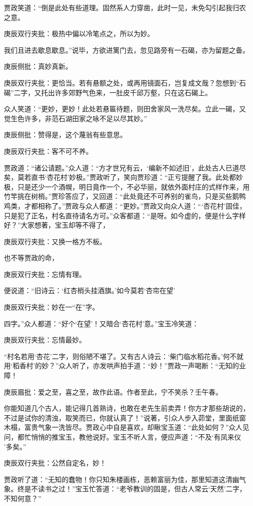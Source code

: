 \begin{parag}


    贾政笑道：“倒是此处有些道理。固然系人力穿凿，此时一见，未免勾引起我归农之意。\begin{note}庚辰双行夹批：极热中偏以冷笔点之，所以为妙。\end{note}我们且进去歇息歇息。”说毕，方欲进篱门去，忽见路旁有一石碣，亦为留题之备。\begin{note}庚辰侧批：真妙真新。\end{note}\begin{note}庚辰双行夹批：更恰当。若有悬额之处，或再用镜面石，岂复成文哉？忽想到“石碣”二字，又托出许多郊野气色来，一肚皮千邱万壑，只在这石碣上。\end{note}众人笑道：“更妙，更妙！此处若悬匾待题，则田舍家风一洗尽矣。立此一碣，又觉生色许多，非范石湖田家之咏不足以尽其妙。”\begin{note}庚辰侧批：赞得是，这个蔑翁有些意思。\end{note}\begin{note}庚辰双行夹批：客不可不养。\end{note}贾政道：“诸公请题。”众人道：“方才世兄有云，‘编新不如述旧’，此处古人已道尽矣，莫若直书‘杏花村’妙极。”贾政听了，笑向贾珍道：“正亏提醒了我。此处都妙极，只是还少一个酒幌，明日竟作一个，不必华丽，就依外面村庄的式样作来，用竹竿挑在树梢。”贾珍答应了，又回道：“此处竟还不可养别的雀鸟，只是买些鹅鸭鸡类，才都相称了。”贾政与众人都道：“更妙。”贾政又向众人道：“‘杏花村’固佳，只是犯了正名，村名直待请名方可。”众客都道：“是呀。如今虚的，便是什么字样好？”大家想著，宝玉却等不得了，\begin{note}庚辰双行夹批：又换一格方不板。\end{note}也不等贾政的命，\begin{note}庚辰双行夹批：忘情有理。\end{note}便说道：“旧诗云：‘红杏梢头挂酒旗。’如今莫若‘杏帘在望’\begin{note}庚辰双行夹批：妙在一“在”字。\end{note}四字。”众人都道：“好个‘在望’！又暗合‘杏花村’意。”宝玉冷笑道：\begin{note}庚辰双行夹批：忘情最妙。\end{note}“村名若用‘杏花’二字，则俗陋不堪了。又有古人诗云：‘柴门临水稻花香。’何不就用‘稻香村’的妙？”众人听了，亦发哄声拍手道：“妙！”贾政一声喝断：“无知的业障！\begin{note}庚辰眉批：爱之至，喜之至，故作此语。作者至此，宁不笑杀？壬午春。\end{note}你能知道几个古人，能记得几首熟诗，也敢在老先生前卖弄！你方才那些胡说的，不过是试你的清浊，取笑而已，你就认真了！”说著，引众人步入茆堂，里面纸窗木榻，富贵气象一洗皆尽。贾政心中自是喜欢，却瞅宝玉道：“此处如何？”众人见问，都忙悄悄的推宝玉，教他说好。宝玉不听人言，便应声道：“不及‘有凤来仪 ’多矣。”\begin{note}庚辰双行夹批：公然自定名，妙！\end{note}贾政听了道：“无知的蠢物！你只知朱楼画栋，恶赖富丽为佳，那里知道这清幽气象。终是不读书之过！”宝玉忙答道：“老爷教训的固是，但古人常云‘天然’二字，不知何意？”
\end{parag}


